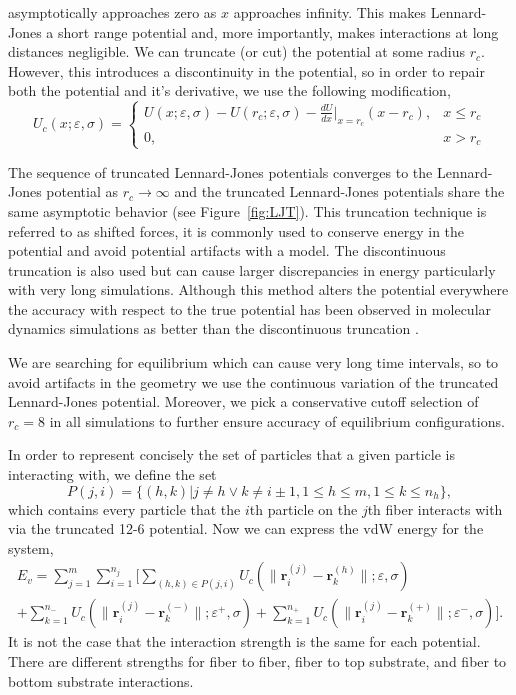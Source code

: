 \noindent	
asymptotically approaches zero as $x$ approaches infinity. This makes Lennard-Jones a short range potential and, more importantly, makes interactions at long distances negligible. We can truncate (or cut) the potential at some radius $r_c$. However, this introduces a discontinuity in the potential, so in order to repair both the potential and it's derivative, we use the following modification,
\begin{equation}
	U_c(x; \varepsilon, \sigma) = \left\{ 
		\begin{array}{lr}
			U(x; \varepsilon, \sigma) - U(r_c; \varepsilon, \sigma) - \frac{dU}{dx}\bigg|_{x = r_c}(x - r_c), & x \leq r_c\\
			0, & x > r_c
		\end{array}
		\right. 
\end{equation}

	The sequence of truncated Lennard-Jones potentials converges to the Lennard-Jones potential as $r_c \to \infty$ and the truncated Lennard-Jones potentials share the same asymptotic behavior (see Figure~\ref{fig:LJT}). This truncation technique is referred to as shifted forces, it is commonly used to conserve energy in the potential and avoid potential artifacts with a model. The discontinuous truncation is also used but can cause larger discrepancies in energy particularly with very long simulations. Although this method alters the potential everywhere the accuracy with respect to the true potential has been observed in molecular dynamics simulations as better than the discontinuous truncation \cite{Toxvaerd2011}.
	
   We are searching for equilibrium which can cause very long time intervals, so to avoid artifacts in the geometry we use the continuous variation of the truncated Lennard-Jones potential. Moreover, we pick a conservative cutoff selection of $r_c = 8$ in all simulations to further ensure accuracy of equilibrium configurations.

	In order to represent concisely the set of particles that a given particle is interacting with, we define the set
\begin{equation}
	P(j,i) = \{ (h,k)|j \neq h \vee k \neq i \pm 1, 1 \leq h \leq m, 1 \leq k \leq n_h \},
\end{equation}
which contains every particle that the $i$th particle on the $j$th fiber interacts with via the truncated 12-6 potential. Now we can express the vdW energy for the system,
\begin{multline}
	E_v = \sum_{j=1}^m \sum_{i=1}^{n_j} \bigg[ \sum_{(h,k) \in P(j,i)} U_c \left( \| \textbf{r}_i^{(j)} - \textbf{r}_k^{(h)} \|; \varepsilon, \sigma \right) \\ + \sum_{k=1}^{n_-} U_c \left( \| \textbf{r}_i^{(j)} - \textbf{r}_k^{(-)} \|; \varepsilon^+, \sigma \right) + \sum_{k=1}^{n_+} U_c \left( \| \textbf{r}_i^{(j)} - \textbf{r}_k^{(+)} \|; \varepsilon^-, \sigma \right) \bigg].
\end{multline}
It is not the case that the interaction strength is the same for each potential. There are different strengths for fiber to fiber, fiber to top substrate, and fiber to bottom substrate interactions.

